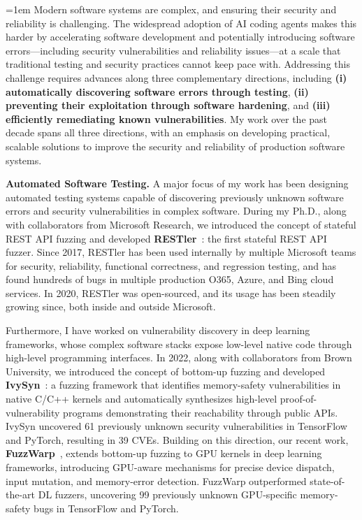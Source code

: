 \documentclass[letterpaper,single,8pt]{article}
\begin{document}
\title{\vspace{-1.2cm}{\bf Towards Secure and Reliable Software Systems}}
\author{ {\rm Vaggelis Atlidakis} }
\date{}
\maketitle

\begingroup\emergencystretch=1em
Modern software systems are complex, and ensuring their security and reliability is challenging. The widespread adoption of AI coding agents makes this harder by accelerating software development and potentially introducing software errors---including security vulnerabilities and reliability issues---at a scale that traditional testing and security practices cannot keep pace with. Addressing this challenge requires advances along three complementary directions, including \textbf{(i) automatically discovering software errors through testing}, \textbf{(ii) preventing their exploitation through software hardening}, and \textbf{(iii) efficiently remediating known vulnerabilities}. My work over the past decade spans all three directions, with an emphasis on developing practical, scalable solutions to improve the security and reliability of production software systems.
\par\endgroup

\textbf{Automated Software Testing.} A major focus of my work has been designing automated testing systems capable of discovering previously unknown software errors and security vulnerabilities in complex software. During my Ph.D., along with collaborators from Microsoft Research, we introduced the concept of stateful REST API fuzzing and developed \textbf{RESTler}~\cite{restler,restler2}: the first stateful REST API fuzzer. Since 2017, RESTler has been used internally by multiple Microsoft teams for security, reliability, functional correctness, and regression testing, and has found hundreds of bugs in multiple production O365, Azure, and Bing cloud services. In 2020, RESTler was open-sourced, and its usage has been steadily growing since, both inside and outside Microsoft.

Furthermore, I have worked on vulnerability discovery in deep learning frameworks, whose complex software stacks expose low-level native code through high-level programming interfaces. In 2022, along with collaborators from Brown University, we introduced the concept of bottom-up fuzzing and developed \textbf{IvySyn}~\cite{ivysyn}: a fuzzing framework that identifies memory-safety vulnerabilities in native C/C++ kernels and automatically synthesizes high-level proof-of-vulnerability programs demonstrating their reachability through public APIs. IvySyn uncovered 61 previously unknown security vulnerabilities in TensorFlow and PyTorch, resulting in 39 CVEs. Building on this direction, our recent work, \textbf{FuzzWarp}~\cite{fuzzwarp}, extends bottom-up fuzzing to GPU kernels in deep learning frameworks, introducing GPU-aware mechanisms for precise device dispatch, input mutation, and memory-error detection. FuzzWarp outperformed state-of-the-art DL fuzzers, uncovering 99 previously unknown GPU-specific memory-safety bugs in TensorFlow and PyTorch.
\end{document}
